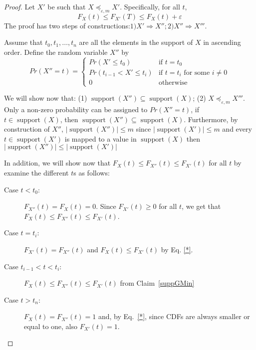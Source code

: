 \documentclass[review]{elsarticle}
\DeclareMathOperator{\support}{support}
\begin{document}
\begin{proof}
Let $X'$ be such that $X \preceq_{\varepsilon,m} X'$. Specifically, for all $t$,
\begin{equation}
F_{X}(t) \leq F_{X'}(T) \leq F_X(t)+\varepsilon
\label{*}
\end{equation}
The proof has two steps of constructions:$1) X'\Rightarrow X''; 2) X''\Rightarrow X'''$.

Assume that $t_0,t_1,\dots,t_n$ are all the elements in the support of $X$ in ascending order. Define the random variable $X''$ by 
$$
Pr(X''=t) = \begin{cases}
Pr(X' \leq t_0)           & \text{if } t=t_0  \\ 
Pr(t_{i-1} < X' \leq t_i) & \text{if } t=t_i \text{ for some } i \neq 0 \\ 
0                         & \text{otherwise}
\end{cases}
$$

We will show now that: (1) $\support(X'') \subseteq \support(X)$; (2) $X \preceq_{\varepsilon,m} X'''$.
Only a non-zero probability can be assigned to $Pr(X''=t)$, if $t \in \support(X)$, then $\support(X'') \subseteq \support(X)$. Furthermore, by construction of $X''$, $|\support(X'')|\leq m$ since $|\support(X')|\leq m$ and every $ t\in \support(X')$ is mapped to a value in $\support(X)$ then $|\support(X'')|\leq |\support(X')|$

In addition, we will show now that $F_{X}(t) \leq  F_{X''}(t) \leq F_{X'}(t)$ for all $t$ by examine the different $t$s as follows: 
\begin{description}
\item[Case $t < t_0$:] $F_{X''}(t)=F_{X}(t)=0$. Since $F_{X'}(t) \geq 0$ for all $t$, we get that $F_{X}(t) \leq  F_{X''}(t) \leq F_{X'}(t)$.
\item[Case $t=t_i$:] $F_{X'}(t)=F_{X''}(t)$ and $F_{X}(t) \leq F_{X'}(t)$ by Eq. \eqref{*}.
\item[Case $t_{i-1} < t < t_i$:]
$F_{X}(t) \leq F_{X''}(t) \leq F_{X'}(t)$ from Claim~\ref{suppGMin}
\item[Case $t > t_n$:] $F_{X}(t)= F_{X''}(t)=1$ and, by Eq.~\eqref{*}, since CDFs are always smaller or equal to one, also $F_{X'}(t)=1$.


\end{description}
\end{proof}
\end{document}
